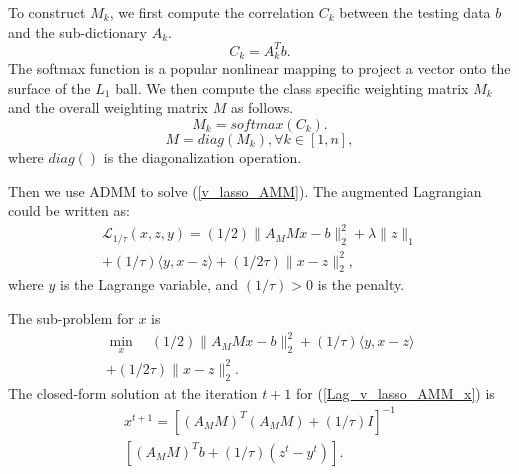 \documentclass{article}
\begin{document}
To construct $M_k$, we first compute the correlation $C_k$ between the testing data $b$ and the sub-dictionary $A_k$.
\begin{equation}
\label{C_k}C_k = A_k^Tb.%
\end{equation}
The softmax function is a popular nonlinear mapping to project a vector onto the surface of the $L_1$ ball. We then compute the class specific weighting matrix $M_k$ and the overall weighting matrix $M$ as follows.
\begin{equation}
\label{M_k}M_k = softmax(C_k).
\end{equation}
\begin{equation}
\label{M}M=diag(M_k), \forall k \in [1,n],
\end{equation}
where $diag()$ is the diagonalization operation.

Then we use ADMM to solve (\ref{v_lasso_AMM}). The augmented Lagrangian could be written as:
\begin{equation}
\label{Lag_v_lasso_AMM}
\begin{split}
\mathcal{L}_{1/ \tau}(x,z,y)=(1/2)\|A_MMx-b\|^2_2+\lambda\|z\|_1 \\ +(1/\tau)\langle y,x-z \rangle+(1/2 \tau) \|x-z\|^2_2,
\end{split}
\end{equation}
where $y$ is the Lagrange variable, and $(1/\tau)>0$ is the penalty. 

The sub-problem for $x$ is
\begin{equation}
\label{Lag_v_lasso_AMM_x}
\begin{split}
\min_x \quad(1/2)\|A_MMx-b\|^2_2+(1/\tau)\langle y,x-z \rangle \\ +(1/2 \tau) \|x-z\|^2_2.
\end{split}
\end{equation}
The closed-form solution at the iteration $t+1$ for (\ref{Lag_v_lasso_AMM_x}) is
\begin{equation}
\label{Lag_v_lasso_AMM_x_ans}
\begin{split}
x^{t+1}=[(A_MM)^T(A_MM)+(1/\tau)I]^{-1} \\ [(A_MM)^Tb+(1/\tau)(z^{t}-y^{t})].
\end{split}
\end{equation}
\end{document}
